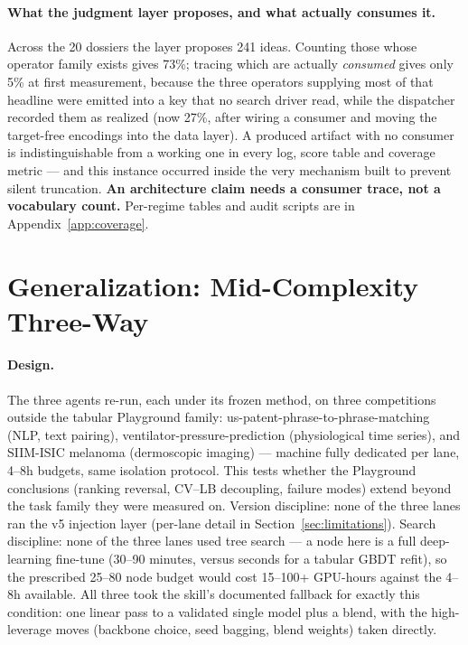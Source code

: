 \documentclass[11pt,a4paper]{article}
\begin{document}
\paragraph{What the judgment layer proposes, and what actually consumes it.} Across the 20
dossiers the layer proposes 241 ideas. Counting those whose operator family exists gives 73\%;
tracing which are actually \emph{consumed} gives only 5\% at first measurement, because the three operators supplying most of
that headline were emitted into a key that no search driver read, while the dispatcher recorded them as
realized (now 27\%, after wiring a consumer and moving the target-free encodings into the data
layer). A produced artifact with no consumer is indistinguishable from a working one in every
log, score table and coverage metric --- and this instance occurred inside the very mechanism
built to prevent silent truncation. \textbf{An architecture claim needs a consumer trace, not a
vocabulary count.} Per-regime tables and audit scripts are in Appendix~\ref{app:coverage}.

\section{Generalization: Mid-Complexity Three-Way}
\label{sec:exp7run2}

\paragraph{Design.} The three agents re-run, each under its frozen method, on three competitions outside the tabular Playground family: us-patent-phrase-to-phrase-matching (NLP, text pairing), ventilator-pressure-prediction (physiological time series), and SIIM-ISIC melanoma (dermoscopic imaging) --- machine fully dedicated per lane, 4--8h budgets, same isolation protocol. This tests whether the Playground conclusions (ranking reversal, CV--LB decoupling, failure modes) extend beyond the task family they were measured on. Version discipline: none of the three lanes ran the v5 injection layer (per-lane detail in Section~\ref{sec:limitations}). Search discipline: none of the three lanes used tree search --- a node here is a full deep-learning fine-tune (30--90 minutes, versus seconds for a tabular GBDT refit), so the prescribed 25--80 node budget would cost 15--100+ GPU-hours against the 4--8h available. All three took the skill's documented fallback for exactly this condition: one linear pass to a validated single model plus a blend, with the high-leverage moves (backbone choice, seed bagging, blend weights) taken directly.
\end{document}
